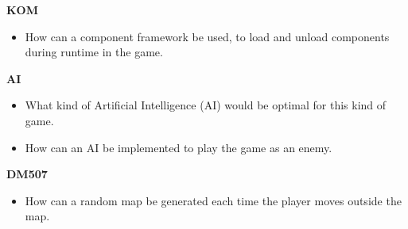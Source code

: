 \documentclass[../main.tex]{subfiles}
\begin{document}
\textbf{KOM}
\begin{itemize}
	\item How can a component framework be used, to load and unload components during runtime in the game.
\end{itemize}
\textbf{AI}
\begin{itemize}
	\item What kind of Artificial Intelligence (AI) would be optimal for this kind of game.
	\item How can an AI be implemented to play the game as an enemy.
\end{itemize}
\textbf{DM507}
\begin{itemize}
	\item How can a random map be generated each time the player moves outside the map.
\end{itemize}
\end{document}
